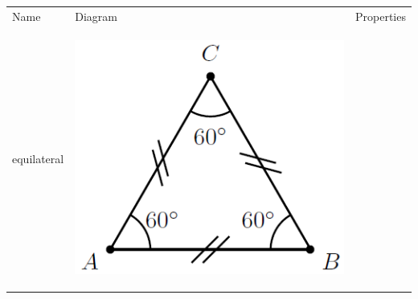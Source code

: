         \begin{center}
      
      \label{m39368*uid39}
      
    \noindent
      \tablelasttail{}
      \begin{xtabular*}{\mytablewidth}[t]{|p{10\mystarwidth}|p{10\mystarwidth}|p{10\mystarwidth}|}\hline
    
    
        Name &
    
    
        Diagram &
    
    
        Properties%
     \tabularnewline{}
    
    
        equilateral &
    
    
        
                  
    \setcounter{subfigure}{0}

\label{m39368*id317558}
    \begin{center}
    \label{m39368*id317558!!!underscore!!!media}\label{m39368*id317558!!!underscore!!!printimage}\includegraphics[width=.2\columnwidth]{col11306.imgs/m39368_MG10C13_023.png} %
        

\end{center}
\end{xtabular*}
\end{center}
